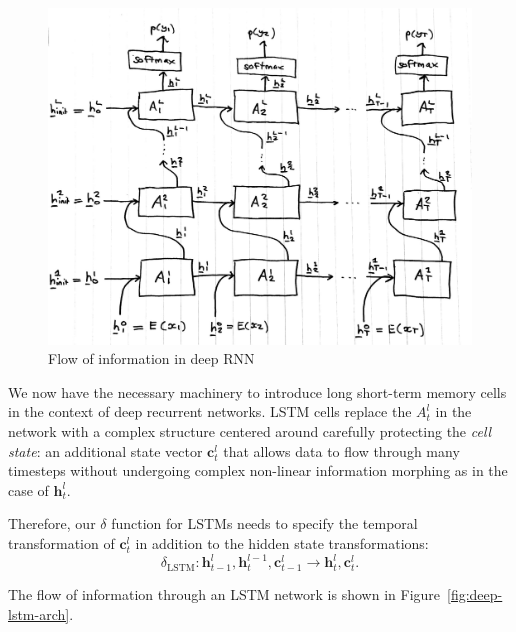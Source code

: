 \documentclass[12pt,a4paper,twoside,openright]{report}
\newcommand{\vect}[1]{\boldsymbol{\mathbf{#1}}}
\begin{document}
\begin{figure}[H]
\centering
\includegraphics[width=350pt]{figs/deep_rnn_tmp.jpg}
\caption{Flow of information in deep RNN}
\label{fig:deep-rnn-arch}
\end{figure}

We now have the necessary machinery to introduce long short-term memory cells in
the context of deep recurrent networks. LSTM cells replace the $A_t^l$ in the
network with a complex structure centered around carefully protecting the
\emph{cell state}: an additional state vector $\vect{c}_t^l$ that allows data to
flow through many timesteps without undergoing complex non-linear information
morphing as in the case of $\vect{h}_t^l$.

Therefore, our $\delta$ function for LSTMs needs to specify the temporal
transformation of $\vect{c}_t^l$ in addition to the hidden state
transformations:
$$ \delta_{\mathrm{LSTM}} : \vect{h}_{t-1}^l, \vect{h}_t^{l-1}, \vect{c}_{t-1}^l
\rightarrow \vect{h}_t^l, \vect{c}_t^l. $$

The flow of information through an LSTM network is shown in
Figure~\ref{fig:deep-lstm-arch}.
\end{document}
